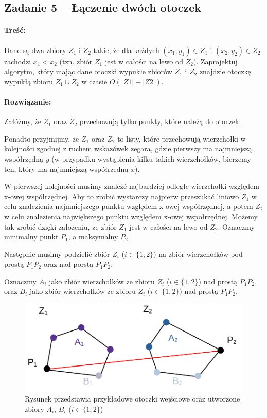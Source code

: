 \subsection{Zadanie 5 -- Łączenie dwóch otoczek}
\paragraph{Treść:} Dane są dwa zbiory $Z_1$ i $Z_2$ takie, że dla każdych $(x_1, y_1) \in Z_1$ i $(x_2, y_2) \in Z_2$ zachodzi $x_1 < x_2$ (tzn. zbiór $Z_1$ jest w całości na lewo od $Z_2$). Zaprojektuj algorytm, który mając dane otoczki wypukłe zbiorów $Z_1$ i $Z_2$
znajdzie otoczkę wypukłą zbioru $Z_1 \cup Z_2$ w czasie $O(|Z1| + |Z2|)$.

\paragraph{Rozwiązanie:} 
Załóżmy, że $Z_1$ oraz $Z_2$ przechowują tylko punkty, które należą do 
otoczek.

Ponadto przyjmijmy, że $Z_1$ oraz $Z_2$ to listy, które przechowują wierzchołki w kolejności zgodnej z ruchem wskazówek zegara, gdzie pierwszy ma najmniejszą współrzędną $y$ (w przypadku wystąpienia kilku takich wierzchołków, bierzemy ten, który ma najmniejszą współrzędną $x$).

W pierwszej kolejności musimy znaleźć najbardziej odległe 
wierzchołki względem x-owej współrzędnej. Aby to zrobić wystarczy
najpierw przeszukać liniowo $Z_1$ w celu znalezienia
najmniejszego punktu względem x-owej współrzędnej, a potem $Z_2$ w celu znalezienia największego punktu względem x-owej wspołrzędnej. Możemy 
tak zrobić dzięki założeniu, że zbiór $Z_1$ jest w całości na lewo od $Z_2$. Oznaczmy minimalny punkt $P_1$, a maksymalny $P_2$.

Następnie musimy podzielić zbiór $Z_i$ ($i \in \{1, 2\}$) na 
zbiór wierzchołków pod prostą $P_1P_2$ oraz nad porstą $P_1P_2$.

Oznaczmy $A_i$ jako zbiór wierzchołków ze zbioru $Z_i$ ($i \in \{1, 2\}$) nad prostą $P_1P_2$, oraz $B_i$ jako zbiór wierzchołków ze zbioru $Z_i$ ($i \in \{1, 2\}$) nad prostą $P_1P_2$.

\begin{figure}[H]
	\centering
	\includegraphics[scale=0.5]{data/zad75.png}
	\caption{Rysunek przedstawia przykładowe otoczki wejściowe oraz utworzone zbiory $A_i$, $B_i$ ($i \in \{1, 2\}$)}
	\label{fig:laczenieotoczek}
\end{figure}

